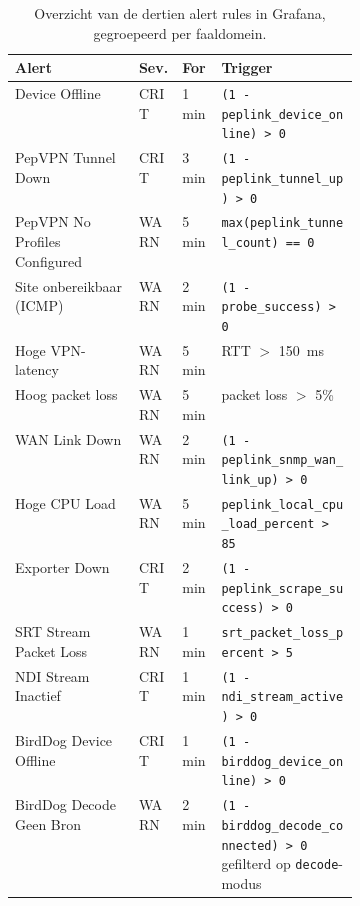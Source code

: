 \begin{table}[H]
  \centering
  \caption[Provisioned alert rules]{Overzicht van de dertien alert rules in Grafana, gegroepeerd per faaldomein.}
  \label{tab:alerts}
  \begin{tabular}{l l l p{0.40\linewidth}}
    \hline
    \textbf{Alert} & \textbf{Sev.} & \textbf{For} & \textbf{Trigger} \\
    \hline
    Device Offline                   & CRIT & 1~min & \texttt{(1 - peplink\_device\_online) > 0} \\
    PepVPN Tunnel Down               & CRIT & 3~min & \texttt{(1 - peplink\_tunnel\_up) > 0} \\
    PepVPN No Profiles Configured    & WARN & 5~min & \texttt{max(peplink\_tunnel\_count) == 0} \\
    Site onbereikbaar (ICMP)         & WARN & 2~min & \texttt{(1 - probe\_success) > 0} \\
    Hoge VPN-latency                 & WARN & 5~min & RTT $>$ 150~ms \\
    Hoog packet loss                 & WARN & 5~min & packet loss $>$ 5\% \\
    WAN Link Down                    & WARN & 2~min & \texttt{(1 - peplink\_snmp\_wan\_link\_up) > 0} \\
    Hoge CPU Load                    & WARN & 5~min & \texttt{peplink\_local\_cpu\_load\_percent > 85} \\
    Exporter Down                    & CRIT & 2~min & \texttt{(1 - peplink\_scrape\_success) > 0} \\
    SRT Stream Packet Loss           & WARN & 1~min & \texttt{srt\_packet\_loss\_percent > 5} \\
    NDI Stream Inactief              & CRIT & 1~min & \texttt{(1 - ndi\_stream\_active) > 0} \\
    BirdDog Device Offline           & CRIT & 1~min & \texttt{(1 - birddog\_device\_online) > 0} \\
    BirdDog Decode Geen Bron         & WARN & 2~min & \texttt{(1 - birddog\_decode\_connected) > 0} gefilterd op \texttt{decode}-modus \\
    \hline
  \end{tabular}
\end{table}

